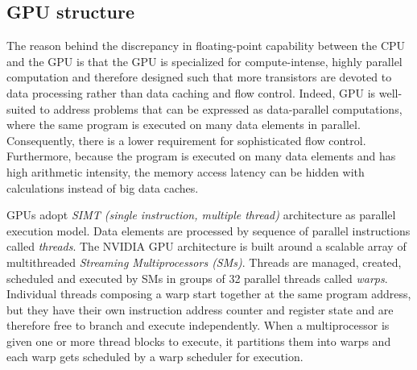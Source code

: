 \subsection{GPU structure}
The reason behind the discrepancy in floating-point capability between the CPU and the GPU is that the GPU is specialized for compute-intense, highly parallel computation and therefore designed such that more transistors are devoted to data processing rather than data caching and flow control. Indeed, GPU is well-suited to address problems that can be expressed as data-parallel computations, where the same program is executed on many data elements in parallel. Consequently, there is a lower requirement for sophisticated flow control. Furthermore, because the program is executed on many data elements and has high arithmetic intensity, the memory access latency can be hidden with calculations instead of big data caches.

GPUs adopt \textit{SIMT (single instruction, multiple thread)} architecture as parallel execution model. Data elements are processed by sequence of parallel instructions called \textit{threads}. The NVIDIA GPU architecture is built around a scalable array of multithreaded \textit{Streaming Multiprocessors (SMs)}. Threads are managed, created, scheduled and executed by SMs in groups of 32 parallel threads called \textit{warps}. Individual threads composing a warp start together at the same program address, but they have their own instruction address counter and register state and are therefore free to branch and execute independently. When a multiprocessor is given one or more thread blocks to execute, it partitions them into warps and each warp gets scheduled by a warp scheduler for execution. 

